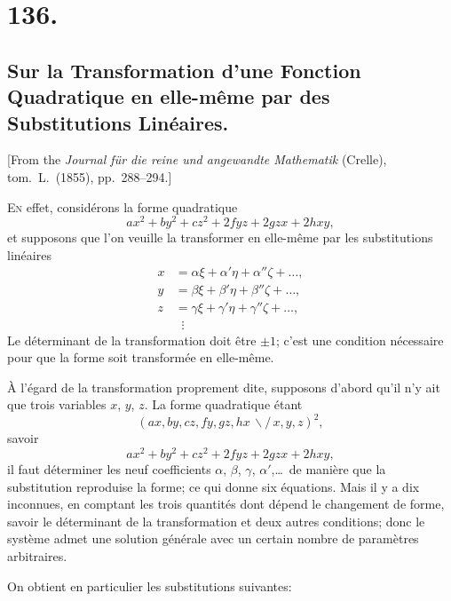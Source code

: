 \documentclass[11pt,a4paper]{article}
\theoremstyle{definition}
\begin{document}
\newpage
\section*{136.}
\subsection*{Sur la Transformation d'une Fonction Quadratique en elle-m\^eme par des Substitutions Lin\'eaires.}

[From the \textit{Journal f\"ur die reine und angewandte Mathematik} (Crelle),
tom.\ L.\ (1855), pp.\ 288--294.]

\medskip

\textsc{En} effet, consid\'erons la forme quadratique
\[
ax^2 + by^2 + cz^2 + 2fyz + 2gzx + 2hxy,
\]
et supposons que l'on veuille la transformer en elle-m\^eme par les
substitutions lin\'eaires
\begin{align*}
x &= \alpha\xi + \alpha'\eta + \alpha''\zeta + \ldots, \\
y &= \beta\xi + \beta'\eta + \beta''\zeta + \ldots, \\
z &= \gamma\xi + \gamma'\eta + \gamma''\zeta + \ldots, \\
& \;\;\vdots
\end{align*}
Le d\'eterminant de la transformation doit \^etre $\pm 1$; c'est une
condition n\'ecessaire pour que la forme soit transform\'ee en elle-m\^eme.

\medskip

\`A l'\'egard de la transformation proprement dite, supposons d'abord
qu'il n'y ait que trois variables $x$, $y$, $z$. La forme quadratique
\'etant
\[
(ax, by, cz, fy, gz, hx \,\backslash\!\!\!/\, x, y, z)^2,
\]
savoir
\[
ax^2 + by^2 + cz^2 + 2fyz + 2gzx + 2hxy,
\]
il faut d\'eterminer les neuf coefficients $\alpha$, $\beta$, $\gamma$,
$\alpha'$,\ldots\ de mani\`ere que la substitution reproduise la forme;
ce qui donne six \'equations. Mais il y a dix inconnues, en comptant les
trois quantit\'es dont d\'epend le changement de forme, savoir le
d\'eterminant de la transformation et deux autres conditions; donc le
syst\`eme admet une solution g\'en\'erale avec un certain nombre de
param\`etres arbitraires.

\medskip

On obtient en particulier les substitutions suivantes:
\end{document}
